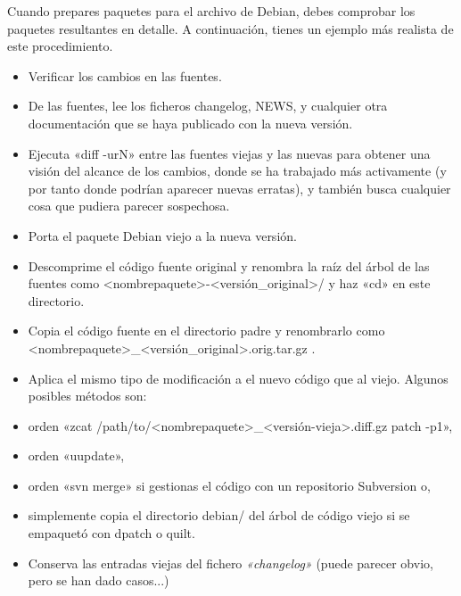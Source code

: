 \documentclass[letterpaper,12pt,spanish]{manual}
\begin{document}
Cuando prepares paquetes para el archivo de Debian, debes comprobar los paquetes resultantes en detalle. A continuación, tienes un ejemplo más realista de este procedimiento.
\begin{itemize}
\item {} 
Verificar los cambios en las fuentes.

\item {} 
De las fuentes, lee los ficheros changelog, NEWS, y cualquier otra documentación que se haya publicado con la nueva versión.

\item {} 
Ejecuta «diff -urN» entre las fuentes viejas y las nuevas para obtener una visión del alcance de los cambios, donde se ha trabajado más activamente (y por tanto donde podrían aparecer nuevas erratas), y también busca cualquier cosa que pudiera parecer sospechosa.

\item {} 
Porta el paquete Debian viejo a la nueva versión.

\item {} 
Descomprime el código fuente original y renombra la raíz del árbol de las fuentes como \textless{}nombrepaquete\textgreater{}-\textless{}versión\_original\textgreater{}/ y haz «cd» en este directorio.

\item {} 
Copia el código fuente en el directorio padre y renombrarlo como \textless{}nombrepaquete\textgreater{}\_\textless{}versión\_original\textgreater{}.orig.tar.gz .

\item {} 
Aplica el mismo tipo de modificación a el nuevo código que al viejo. Algunos posibles métodos son:

\item {} 
orden «zcat /path/to/\textless{}nombrepaquete\textgreater{}\_\textless{}versión-vieja\textgreater{}.diff.gz \textbar{} patch -p1»,

\item {} 
orden «uupdate»,

\item {} 
orden «svn merge» si gestionas el código con un repositorio Subversion o,

\item {} 
simplemente copia el directorio debian/ del árbol de código viejo si se empaquetó con dpatch o quilt.

\item {} 
Conserva las entradas viejas del fichero \emph{«changelog»} (puede parecer obvio, pero se han dado casos...)


\end{itemize}
\end{document}
